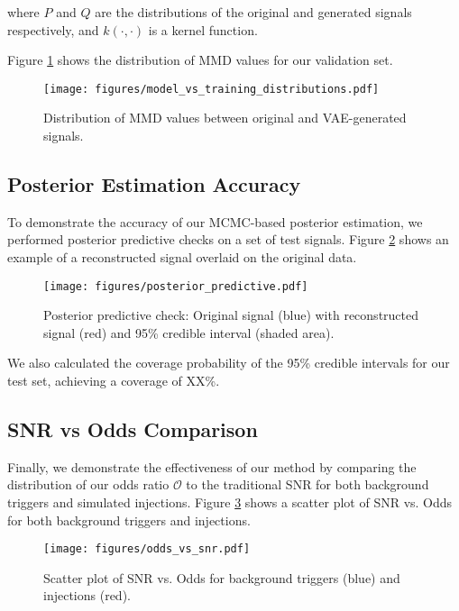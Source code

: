 \documentclass[twocolumn]{aastex631}
\begin{document}
where $P$ and $Q$ are the distributions of the original and generated signals respectively, and $k(\cdot,\cdot)$ is a kernel function.

Figure \ref{fig:mmd_comparison} shows the distribution of MMD values for our validation set.

\begin{figure}[h]
    \centering
    \texttt{[image: figures/model\_vs\_training\_distributions.pdf]}
    \caption{Distribution of MMD values between original and VAE-generated signals.}
    \label{fig:mmd_comparison}
\end{figure}

\subsection{Posterior Estimation Accuracy}
To demonstrate the accuracy of our MCMC-based posterior estimation, we performed posterior predictive checks on a set of test signals. 
Figure \ref{fig:posterior_check} shows an example of a reconstructed signal overlaid on the original data.

\begin{figure}[h]
    \centering
    \texttt{[image: figures/posterior\_predictive.pdf]}
    \caption{Posterior predictive check: Original signal (blue) with reconstructed signal (red) and 95\% credible interval (shaded area).}
    \label{fig:posterior_check}
\end{figure}

We also calculated the coverage probability of the 95\% credible intervals for our test set, achieving a coverage of XX\%.

\subsection{SNR vs Odds Comparison}


Finally, we demonstrate the effectiveness of our method by comparing the distribution of our odds ratio $\mathcal{O}$ to the traditional SNR for both background triggers and simulated injections. 
Figure \ref{fig:snr_vs_odds} shows a scatter plot of SNR vs. Odds for both background triggers and injections.

\begin{figure}[h]
    \centering
    \texttt{[image: figures/odds\_vs\_snr.pdf]}
    \caption{Scatter plot of SNR vs. Odds for background triggers (blue) and injections (red).}
    \label{fig:snr_vs_odds}
\end{figure}
\end{document}

